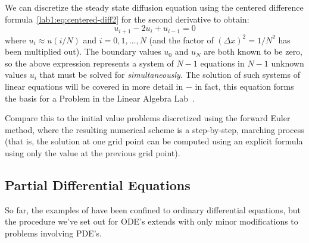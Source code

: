 \begin{example}
  \label{lab1:exm:steady-diffusion}
  We can discretize the steady state diffusion equation using the
  centered difference formula~\eqref{lab1:eq:centered-diff2} for the
  second derivative to obtain:
  \[
  u_{i+1}-2u_i+u_{i-1} = 0
  \]
  where $u_i\approx u(i/N)$ and $i=0,1,\ldots,N$ (and the factor of
  $(\Delta x)^2 = {1}/{N^2}$ has been multiplied out).  
  The boundary values $u_0$ and $u_N$ are both known to be zero, so
  the above expression represents a system of $N-1$ equations in $N-1$
  unknown values $u_i$ that must be solved for \emph{simultaneously}.
  The solution of such systems of linear equations will be covered in
  more detail in  $-$ in
  fact, this equation forms the basis for a Problem in the
  Linear Algebra Lab~.

  Compare this to the initial value problems discretized using the
  forward Euler method, where the resulting numerical scheme is
  a step-by-step, marching process (that is, the solution at one grid
  point can be computed using an explicit formula using only the value
  at the previous grid point).
\end{example}

\subsection{Partial Differential Equations}

So far, the examples of have been confined to ordinary differential
equations, but the procedure we've set out for ODE's extends with only
minor modifications to problems involving PDE's.  

